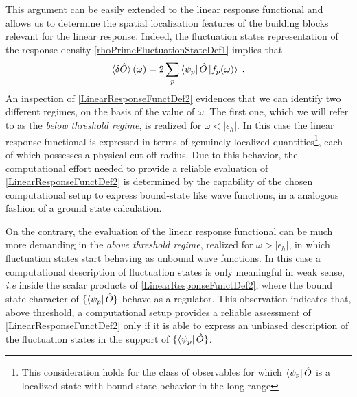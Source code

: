 \documentclass[reprint,aps,prb]{revtex4-1}
\newcommand{\eps}{\epsilon}
\newcommand{\be}{\begin{equation}}
\newcommand{\ee}{\end{equation}}
\newcommand{\lb}{\label}
\newcommand{\op}[1]{\hat {#1}}
\begin{document}
This argument can be easily extended to the linear response functional and allows us to determine the spatial localization features of the building blocks relevant for the linear response.  
Indeed, the fluctuation states representation of the response density \eqref{rhoPrimeFluctuationStateDef1} implies that
\be\lb{LinearResponseFunctDef2}
\braket{\delta\op O}(\omega) = 2\sum_p \bra{\psi_p}\op O\ket{f_p(\omega)} \;.
\ee
An inspection of \eqref{LinearResponseFunctDef2} evidences that we can identify two different regimes, on the basis of the value of $\omega$. The first one, which we will refer to as the
\emph{below threshold regime}, is realized for $\omega<|\eps_h|$. In this case the linear response functional is expressed in terms of genuinely localized quantities\footnote{This consideration 
holds for the class of observables for which $\bra{\psi_p}\op O$ is a localized state  with bound-state behavior in the long range}, each of which possesses a physical cut-off radius. 
Due to this behavior, the computational effort needed to provide a reliable evaluation of \eqref{LinearResponseFunctDef2} is determined by the capability of the chosen computational setup to 
express bound-state like wave functions, in a analogous fashion of a ground state calculation. 

On the contrary, the evaluation of the linear response functional can be much more demanding in the \emph{above threshold regime}, realized for $\omega>|\eps_h|$, in which fluctuation 
states start behaving as unbound wave functions. In this case a computational description of fluctuation states is only meaningful in weak sense, \emph{i.e} inside the scalar products of 
\eqref{LinearResponseFunctDef2}, where the bound state character of $\{\bra{\psi_p}\op O\}$ behave as a regulator. This observation indicates that, above threshold, a computational setup 
provides a reliable assessment of \eqref{LinearResponseFunctDef2} only if it is able to express an unbiased description of the fluctuation states in the support of $\{\bra{\psi_p}\op O\}$. 
\end{document}
